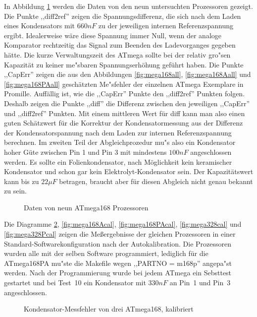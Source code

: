In Abbildung \ref{fig:CompAdjust} werden die Daten von den neun untersuchten Prozessoren gezeigt.
Die Punkte ,,diff2ref'' zeigen die Spannungsdifferenz, die sich nach dem Laden eines Kondensators mit \(660 nF\) zu der
jeweiligen internen Referenzspannung ergibt. Idealerweise w\"are diese Spannung immer Null, wenn der analoge
Komparator rechtzeitig das Signal zum Beenden des Ladevorganges gegeben h\"atte. Die kurze Verwaltungszeit des ATmega
sollte bei der relativ gro"sen Kapazit\"at zu keiner me"sbaren Spannungserh\"ohung gef\"uhrt haben.
Die Punkte ,,CapErr'' zeigen die aus den Abbildungen \ref{fig:mega168all}, \ref{fig:mega168Aall} und \ref{fig:mega168PAall} 
gesch\"atzten Me"sfehler der einzelnen ATmega Exemplare in Promille.
Auff\"allig ist, wie die ,,CapErr'' Punkte den ,,diff2ref'' Punkten folgen.
Deshalb zeigen die Punkte ,,diff'' die Differenz zwischen den jeweiligen ,,CapErr'' und ,,diff2ref'' Punkten.
Mit einem mittleren Wert f\"ur diff kann man also einen guten Sch\"atzwert f\"ur die Korrektur der Kondensatormessung aus der
Differenz der Kondensatorspannung nach dem Laden zur internen Referenzspannung berechnen.
Im zweiten Teil der Abgleichprozedur mu"s also ein Kondensator hoher G\"ute zwischen Pin 1 und Pin 3 mit mindestens \(100 nF\)
angeschlossen werden. Es sollte ein Folienkondensator, nach M\"oglichkeit kein keramischer Kondensator und schon gar kein
Elektrolyt-Kondensator sein. Der Kapazit\"atswert kann bis zu \(22 \mu F\) betragen,
braucht aber f\"ur diesen Abgleich nicht genau bekannt zu sein.

\begin{figure}[H]
\centering

\caption{Daten von neun ATmega168 Prozessoren}
\label{fig:CompAdjust}
\end{figure}

Die Diagramme \ref{fig:mega168cal}, \ref{fig:mega168Acal}, \ref{fig:mega168PAcal},  \ref{fig:mega328cal} und
\ref{fig:mega328Pcal} zeigen die Meßergebnisse
der gleichen Prozessoren in einer Standard-Softwarekonfiguration nach der Autokalibration.
Die Prozessoren wurden alle mit der selben Software programmiert, lediglich f\"ur die ATmega168PA mu"ste die
Makefile wegen ,,PARTNO = m168p'' angepa"st werden. Nach der Programmierung wurde bei jedem ATmega ein
Sebsttest gestartet und bei Test~10 ein Kondensator mit \(330 nF\) an Pin~1 und Pin~3 angeschlossen.

\begin{figure}[H]
\centering

\caption{Kondensator-Messfehler von drei ATmega168, kalibriert}
\label{fig:mega168cal}
\end{figure}

